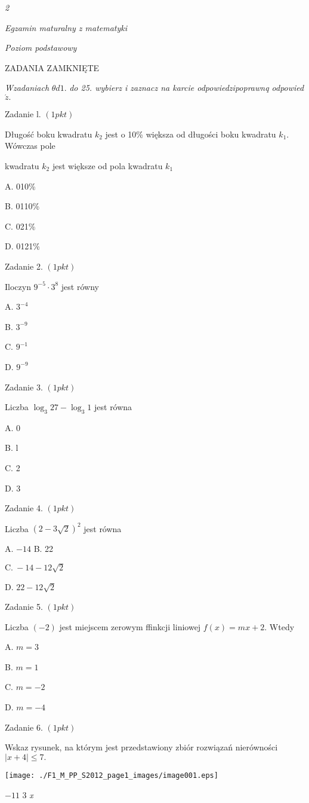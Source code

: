\documentclass[a4paper,12pt]{article}
\begin{document}
{\it 2}

{\it Egzamin maturalny z matematyki}

{\it Poziom podstawowy}

ZADANIA ZAMKNIĘTE

{\it Wzadaniach} $\theta d1.$ {\it do 25. wybierz i zaznacz na karcie odpowiedzipoprawnq odpowied} $\acute{z}.$

Zadanie l. $(1pkt)$

Długość boku kwadratu $k_{2}$ jest o 10\% większa od długości boku kwadratu $k_{1}$. Wówczas pole

kwadratu $k_{2}$ jest większe od pola kwadratu $k_{1}$

A. 010\%

B. 0110\%

C. 021\%

D. 0121\%

Zadanie 2. $(1pkt)$

Iloczyn $9^{-5}\cdot 3^{8}$ jest równy

A. $3^{-4}$

B. $3^{-9}$

C. $9^{-1}$

D. $9^{-9}$

Zadanie 3. $(1pkt)$

Liczba $\log_{3}27-\log_{3}1$ jest równa

A. 0

B. l

C. 2

D. 3

Zadanie 4. $(1pkt)$

Liczba $(2-3\sqrt{2})^{2}$ jest równa

A. $-14$ B. 22

$\mathrm{C}.\ -14-12\sqrt{2}$

D. $22-12\sqrt{2}$

Zadanie 5. $(1pkt)$

Liczba $(-2)$ jest miejscem zerowym ffinkcji liniowej $f(x)=mx+2$. Wtedy

A. $m=3$

B. $m=1$

C. $m=-2$

D. $m=-4$

Zadanie 6. $(1pkt)$

Wskaz rysunek, na którym jest przedstawiony zbiór rozwiązań nierówności $|x+4|\leq 7.$
\begin{center}
\texttt{[image: ./F1\_M\_PP\_S2012\_page1\_images/image001.eps]}
\end{center}
$-11$  3  {\it x}
\end{document}
